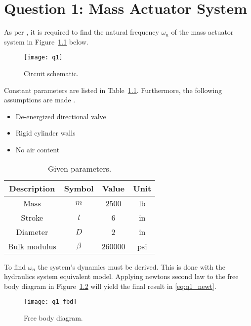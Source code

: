 \chapter{Question 1: Mass Actuator System}
\label{chap:q1}

As per \cite{assign}, it is required to find the natural frequency $\omega_n$ of the mass actuator system in Figure~\ref{fig:q1} below.

\begin{figure}[H]
	\centering
	\texttt{[image: q1]}
	\caption{Circuit schematic.}
	\label{fig:q1}
\end{figure}

Constant parameters are listed in Table~\ref{tab:q1_param}. Furthermore, the following assumptions are made \cite{assign}.
\begin{itemize}
\item De-energized directional valve
\item Rigid cylinder walls
\item No air content
\end{itemize}

\begin{table}[H]
  \centering
  \caption{Given parameters.}
    \begin{tabular}{cccc}
    \textbf{Description} & \textbf{Symbol} & \textbf{Value } & \textbf{Unit} \\
    \midrule
    Mass  & $m$   & 2500  & lb \\
    Stroke & $l$   & 6     & in \\
    Diameter & $D$   & 2     & in \\
    Bulk modulus & $\beta$ & 260000 & psi \\
    \end{tabular}
  \label{tab:q1_param}
\end{table}

To find $\omega_n$ the system's dynamics must be derived. This is done with the hydraulics system equivalent model. Applying newtons second law to the free body diagram in Figure~\ref{fig:q1_fbd} will yield the final result in \ref{eq:q1_newt}.

\begin{figure}[H]
	\centering
	\texttt{[image: q1\_fbd]}
	\caption{Free body diagram.}
	\label{fig:q1_fbd}
\end{figure}

